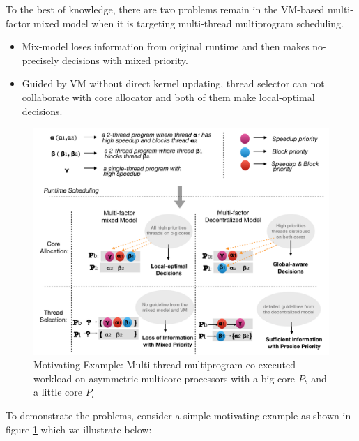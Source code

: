 \documentclass[sigplan,review,anonymous]{acmart}\settopmatter{printfolios=true,printccs=false,printacmref=false}
\begin{document}
To the best of knowledge, there are two problems remain in the VM-based multi-factor mixed model when it is targeting multi-thread multiprogram scheduling.   
\begin{itemize}
\item Mix-model loses information from original runtime and then makes no-precisely decisions with mixed priority. 
\item Guided by VM without direct kernel updating, thread selector can not collaborate with core allocator and both of them make local-optimal decisions.  
\end{itemize}
\begin{figure}
\centering
\includegraphics[scale=0.35]{figures/mt2.png}
\caption{Motivating Example: Multi-thread multiprogram co-executed workload on asymmetric multicore processors with a big core $P_b$ and a little core $P_l$}
\label{me}
\end{figure} 

To demonstrate the problems, consider a simple motivating example as shown in figure \ref{me} which we illustrate below:
\end{document}
